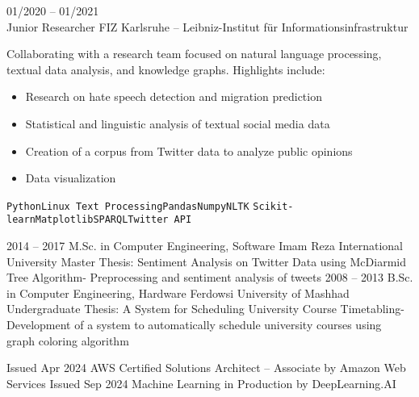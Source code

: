 \documentclass[9pt]{developercv} %
\begin{document}
\begin{entrylist}
{        }
    	\entry
    		{01/2020 -- 01/2021\\}
    		{Junior Researcher}
    		{FIZ Karlsruhe – Leibniz-Institut für Informationsinfrastruktur}
    		{Collaborating with a research team focused on natural language processing, textual data analysis, and knowledge graphs. Highlights include:
            \begin{itemize}
                \item Research on hate speech detection and migration prediction
                \item Statistical and linguistic analysis of textual social media data
                \item Creation of a corpus from Twitter data to analyze public opinions
                \item Data visualization
            \end{itemize}
            \texttt{Python}\slashsep\texttt{Linux Text Processing}\slashsep\texttt{Pandas}\slashsep\texttt{Numpy}\slashsep\texttt{NLTK}\slashsep
            \texttt{Scikit-learn}\slashsep\texttt{Matplotlib}\slashsep\texttt{SPARQL}\slashsep\texttt{Twitter API}
            }
    \end{entrylist}


    \pagebreak
	\begin{entrylist}
		\entry
		{2014 – 2017}
		{M.Sc. in Computer Engineering, Software}
		{Imam Reza International University}
		{Master Thesis: Sentiment Analysis on Twitter Data using McDiarmid Tree Algorithm- Preprocessing and sentiment analysis of tweets}
		\entry
		{2008 – 2013}
		{B.Sc. in Computer Engineering, Hardware}
		{Ferdowsi University of Mashhad}
		{Undergraduate Thesis: A System for Scheduling University Course Timetabling- Development of a system to automatically schedule university courses using graph coloring algorithm}
	\end{entrylist}

	\cvsect{Certifications}
    \begin{entrylist}
        \entry
        {Issued Apr 2024}
        {AWS Certified Solutions Architect – Associate}
        {by Amazon Web Services}
        \entry
        {Issued Sep 2024}
        {Machine Learning in Production}
        {by DeepLearning.AI}
    \end{entrylist}
\end{document}
